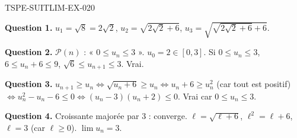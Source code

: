 \begin{corrige}{TSPE-SUITLIM-EX-020}

\textbf{Question 1.} $u_1 = \sqrt{8} = 2\sqrt{2}$, $u_2 = \sqrt{2\sqrt{2}+6}$, $u_3 = \sqrt{\sqrt{2\sqrt{2}+6}+6}$.

\textbf{Question 2.} $\mathcal{P}(n)$ : « $0 \leq u_n \leq 3$ ». $u_0 = 2 \in [0,3]$. Si $0 \leq u_n \leq 3$, $6 \leq u_n + 6 \leq 9$, $\sqrt{6} \leq u_{n+1} \leq 3$. Vrai.

\textbf{Question 3.} $u_{n+1} \geq u_n \iff \sqrt{u_n+6} \geq u_n \iff u_n + 6 \geq u_n^2$ (car tout est positif) $\iff u_n^2 - u_n - 6 \leq 0 \iff (u_n-3)(u_n+2) \leq 0$. Vrai car $0 \leq u_n \leq 3$.

\textbf{Question 4.} Croissante majorée par $3$ : converge. $\ell = \sqrt{\ell+6}$, $\ell^2 = \ell+6$, $\ell = 3$ (car $\ell \geq 0$). $\boxed{\lim u_n = 3}$.

\end{corrige}
